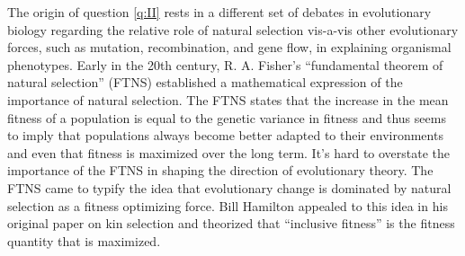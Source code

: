 \documentclass[11pt]{article}
\begin{document}
The origin of question \ref{q:II} rests in a different set of debates in evolutionary biology regarding the relative role of natural selection vis-a-vis other evolutionary forces, such as mutation, recombination, and gene flow, in explaining organismal phenotypes. Early in the 20th century, R. A. Fisher's ``fundamental theorem of natural selection'' (FTNS) \cite{Fisher:1930} established a mathematical expression of the importance of natural selection. The FTNS states that the increase in the mean fitness of a population is equal to the genetic variance in fitness and thus seems to imply that populations always become better adapted to their environments and even that fitness is maximized over the long term. It's hard to overstate the importance of the FTNS in shaping the direction of evolutionary theory. The FTNS came to typify the idea that evolutionary change is dominated by natural selection as a fitness optimizing force. Bill Hamilton appealed to this idea in his original paper on kin selection \cite{Hamilton:1964} and theorized that ``inclusive fitness'' is the fitness quantity that is maximized.
\end{document}

